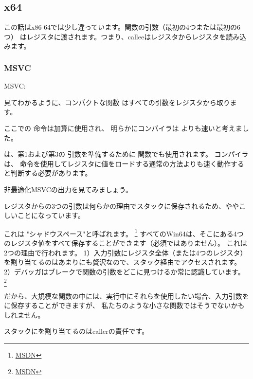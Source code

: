 \subsection{x64}


この話はx86-64では少し違っています。関数の引数（最初の4つまたは最初の6つ）
はレジスタに渡されます。つまり、\gls{callee}はレジスタからレジスタを読み込みます。

\subsubsection{MSVC}

\Optimizing MSVC:



見てわかるように、コンパクトな関数 \ttf はすべての引数をレジスタから取ります。

ここでの \LEA 命令は加算に使用され、
明らかにコンパイラは  よりも速いと考えました。

\LEA は、第1および第3の \ttf 引数を準備するために \main 関数でも使用されます。
コンパイラは、 \MOV 命令を使用してレジスタに値をロードする通常の方法よりも速く動作すると判断する必要があります。

非最適化MSVCの出力を見てみましょう。



レジスタからの3つの引数は何らかの理由でスタックに保存されるため、ややこしいことになっています。

\label{shadow_space}
これは "シャドウスペース"と呼ばれます。
\footnote{\href{http://go.yurichev.com/17256}{MSDN}}
すべてのWin64は、そこにある4つのレジスタ値をすべて保存することができます（必須ではありません）。
これは2つの理由で行われます。
1）入力引数にレジスタ全体（または4つのレジスタ）を割り当てるのはあまりにも贅沢なので、スタック経由でアクセスされます。 
2）デバッガはブレークで関数の引数をどこに見つけるか常に認識しています。
\footnote{\href{http://go.yurichev.com/17257}{MSDN}}

だから、大規模な関数の中には、実行中にそれらを使用したい場合、入力引数を に保存することができますが、
私たちのような小さな関数ではそうでないかもしれません。

スタックにを割り当てるのは\gls{caller}の責任です。

